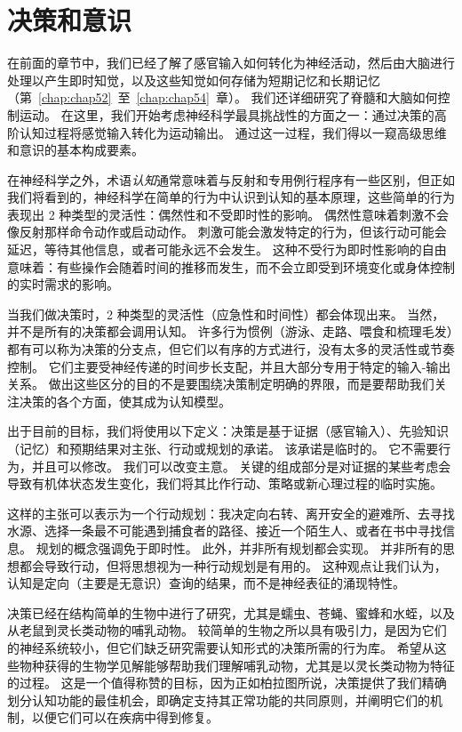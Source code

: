 \chapter{决策和意识} \label{chap:chap56}

在前面的章节中，我们已经了解了感官输入如何转化为神经活动，然后由大脑进行处理以产生即时知觉，以及这些知觉如何存储为短期记忆和长期记忆（第~\ref{chap:chap52}~至~\ref{chap:chap54}~章）。
我们还详细研究了脊髓和大脑如何控制运动。
在这里，我们开始考虑神经科学最具挑战性的方面之一：通过决策的高阶认知过程将感觉输入转化为运动输出。
通过这一过程，我们得以一窥高级思维和意识的基本构成要素。


在神经科学之外，术语\textit{认知}通常意味着与反射和专用例行程序有一些区别，但正如我们将看到的，神经科学在简单的行为中认识到认知的基本原理，这些简单的行为表现出 2 种类型的灵活性：偶然性和不受即时性的影响。
偶然性意味着刺激不会像反射那样命令动作或启动动作。
刺激可能会激发特定的行为，但该行动可能会延迟，等待其他信息，或者可能永远不会发生。
这种不受行为即时性影响的自由意味着：有些操作会随着时间的推移而发生，而不会立即受到环境变化或身体控制的实时需求的影响。


当我们做决策时，2 种类型的灵活性（应急性和时间性）都会体现出来。
当然，并不是所有的决策都会调用认知。
许多行为惯例（游泳、走路、喂食和梳理毛发）都有可以称为决策的分支点，但它们以有序的方式进行，没有太多的灵活性或节奏控制。
它们主要受神经传递的时间步长支配，并且大部分专用于特定的输入-输出关系。
做出这些区分的目的不是要围绕决策制定明确的界限，而是要帮助我们关注决策的各个方面，使其成为认知模型。


出于目前的目标，我们将使用以下定义：决策是基于证据（感官输入）、先验知识（记忆）和预期结果对主张、行动或规划的承诺。
该承诺是临时的。
它不需要行为，并且可以修改。
我们可以改变主意。
关键的组成部分是对证据的某些考虑会导致有机体状态发生变化，我们将其比作行动、策略或新心理过程的临时实施。


这样的主张可以表示为一个行动规划：我决定向右转、离开安全的避难所、去寻找水源、选择一条最不可能遇到捕食者的路径、接近一个陌生人、或者在书中寻找信息。
规划的概念强调免于即时性。
此外，并非所有规划都会实现。
并非所有的思想都会导致行动，但将思想视为一种行动规划是有用的。
这种观点让我们认为，认知是定向（主要是无意识）查询的结果，而不是神经表征的涌现特性。


决策已经在结构简单的生物中进行了研究，尤其是蠕虫、苍蝇、蜜蜂和水蛭，以及从老鼠到灵长类动物的哺乳动物。
较简单的生物之所以具有吸引力，是因为它们的神经系统较小，但它们缺乏研究需要认知形式的决策所需的行为库。
希望从这些物种获得的生物学见解能够帮助我们理解哺乳动物，尤其是以灵长类动物为特征的过程。
这是一个值得称赞的目标，因为正如柏拉图所说，决策提供了我们精确划分认知功能的最佳机会，即确定支持其正常功能的共同原则，并阐明它们的机制，以便它们可以在疾病中得到修复。


